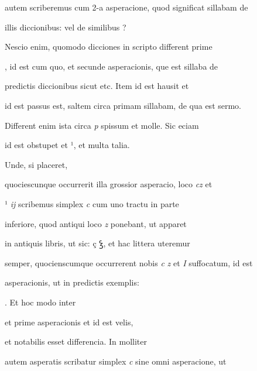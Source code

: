 autem scriberemus  cum 2-a asperacione, quod significat sillabam de

illis diccionibus:    vel de similibus ?

Nescio enim, quomodo dicciones in scripto different  prime 

, id est cum quo, et  secunde asperacionis, que est sillaba de

predictis diccionibus sicut  etc. Item  id est hausit et

 id est passus est, saltem circa primam sillabam, de qua est sermo.

Different enim ista circa \textit{p} spissum et molle. Sic eciam 

\splitlines

id est obstupet et ¹, et multa talia.

\indentK Unde, si placeret,

\fulllines

quociescunque occurrerit illa grossior asperacio,  loco \textit{cz} et

¹ \textit{ij} scribemus simplex \textit{c} cum uno tractu in parte

inferiore, quod antiqui loco \textit{z} ponebant, ut apparet

in antiquis libris, ut sic: ç {\Quivira ꝣ}, et hac littera uteremur

semper, quocienscumque occurrerent nobis \textit{c} \textit{z} et \textit{I} suffocatum, id est 

 asperacionis, ut in predictis exemplis:  

    . Et hoc modo inter 

et  prime asperacionis et  id est velis, 

 et  notabilis esset differencia. In molliter

autem asperatis scribatur simplex \textit{c} sine omni asperacione, ut

